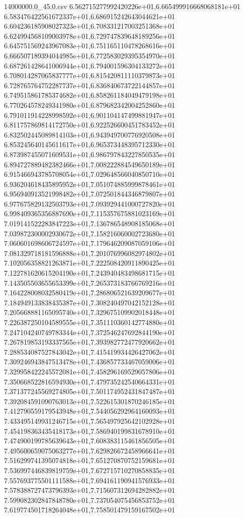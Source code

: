 \begin{filecontents*}{14000000.0_45.0.csv}
6.562715277992420226e+01,6.665499916668068181e+01
6.583476422561672337e+01,6.686915242643044621e+01
6.604236185908027323e+01,6.708331217003251368e+01
6.624994568109003978e+01,6.729747839648189256e+01
6.645751569243967083e+01,6.751165110478268616e+01
6.666507189394044985e+01,6.772583029395354970e+01
6.687261428641006944e+01,6.794001596304133272e+01
6.708014287065837777e+01,6.815420811110379873e+01
6.728765764752287737e+01,6.836840673722144857e+01
6.749515861785374682e+01,6.858261184049479198e+01
6.770264578249341980e+01,6.879682342004252860e+01
6.791011914228998592e+01,6.901104147499881947e+01
6.811757869814172750e+01,6.922526600451783452e+01
6.832502445089814103e+01,6.943949700776920508e+01
6.853245640145611617e+01,6.965373448395712330e+01
6.873987455071609531e+01,6.986797843227850535e+01
6.894727889482382466e+01,7.008222884549650189e+01
6.915466943785708054e+01,7.029648566040850710e+01
6.936204618435895952e+01,7.051074885999878461e+01
6.956940913521998482e+01,7.072501844346879807e+01
6.977675829132503793e+01,7.093929441000727820e+01
6.998409365356887690e+01,7.115357675881023169e+01
7.019141522283847223e+01,7.136786548908185068e+01
7.039872300002930672e+01,7.158216060002723680e+01
7.060601698606724597e+01,7.179646209087059106e+01
7.081329718181596888e+01,7.201076996082974802e+01
7.102056358821263871e+01,7.222508420911890425e+01
7.122781620615204190e+01,7.243940483498681715e+01
7.143505503655653399e+01,7.265373183766769216e+01
7.164228008032580419e+01,7.286806521639209677e+01
7.184949133838435387e+01,7.308240497042152128e+01
7.205668881165095740e+01,7.329675109902018448e+01
7.226387250104589555e+01,7.351110360142774880e+01
7.247104240749783344e+01,7.372546247692844190e+01
7.267819853193337565e+01,7.393982772477920662e+01
7.288534087527843042e+01,7.415419934426427062e+01
7.309246943847513478e+01,7.436857733467059006e+01
7.329958422245572081e+01,7.458296169529057806e+01
7.350668522816594930e+01,7.479735242540664331e+01
7.371377245569274805e+01,7.501174952431847487e+01
7.392084591090763013e+01,7.522615301870246185e+01
7.412790559179543948e+01,7.544056292964160093e+01
7.433495149931246715e+01,7.565497925642102928e+01
7.454198363435418173e+01,7.586940199831678910e+01
7.474900199785639643e+01,7.608383115461856505e+01
7.495600659075063277e+01,7.629826672458966641e+01
7.516299741395074818e+01,7.651270870752159681e+01
7.536997446839819759e+01,7.672715710270858835e+01
7.557693775501111588e+01,7.694161190941576933e+01
7.578388727473796393e+01,7.715607312694282882e+01
7.599082302847848780e+01,7.737054075456853752e+01
7.619774501718264048e+01,7.758501479159167502e+01

\end{filecontents*}

